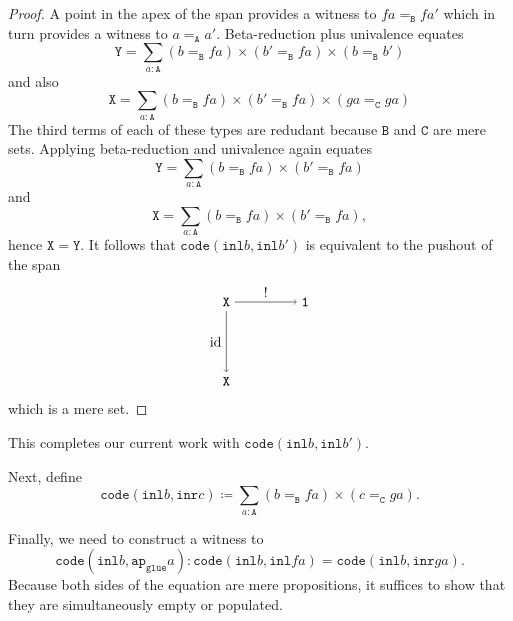 \documentclass[12pt]{amsart}
\newcommand{\bydef}{\coloneqq}
\newcommand{\type}[1]{\mathtt{#1}}
\newcommand{\tin}{\colon}
\newcommand{\A}{\type{A}}
\newcommand{\B}{\type{B}}
\newcommand{\C}{\type{C}}
\newcommand{\ap}{\type{ap}}
\newcommand{\inl}{\type{inl}}
\newcommand{\inr}{\type{inr}}
\newcommand{\glue}{\type{glue}}
\newcommand{\code}{\type{code}}
\DeclareMathOperator{\id}{id}
\theoremstyle{remark}
\theoremstyle{definition}
\begin{document}
\begin{proof}
  A point in the apex of the span provides a witness to
  \(
      fa =_\B fa'
  \)
  which in turn provides a witness to
  \(
      a =_\A a'.
  \)
  Beta-reduction plus univalence equates
  \[
    \type{Y} =
    \sum\limits_{a \tin \A}
    (b=_{\B} fa) \times (b'=_{\B} fa) \times (b=_{\B} b')
  \]
  and also
  \[
    \type{X} =
    \sum\limits_{a \tin \A}
    (b=_{\B} fa) \times (b'=_{\B} fa) \times ( ga =_{\C} ga )
  \]
  The third terms of each of these types are redudant because \( \B \)
  and \( \C \) are mere sets. Applying beta-reduction and univalence
  again equates
  \[
    \type{Y} =
    \sum\limits_{a \tin \A}
    (b=_{\B} fa) \times (b'=_{\B} fa)
  \]
  and
  \[
    \type{X} =
    \sum\limits_{a \tin \A}
    (b=_{\B} fa) \times (b'=_{\B} fa),
  \]
  hence
  \(
      \type{X} = \type{Y}.
  \)
  It follows that
  \(
      \code ( \inl b , \inl b')
  \)
  is equivalent to the pushout of the span
  \[
    \begin{tikzpicture}
      \node (1) at (-1,1) {\( \type{X} \)};
      \node (2) at (-1,-1) {\( \type{X} \)};
      \node (3) at (1,1) {\( \type{1} \)};
      \draw [->] (1) to node [left] {\( \id \)} (2);
      \draw [->] (1) to node [above] {\( ! \)} (3);
    \end{tikzpicture}
  \]
  which is a mere set.
%  
\end{proof}


This completes our current work with
\(
    \code ( \inl b , \inl b' ).
\)
\par

Next, define
\[
  \code ( \inl b , \inr c ) \bydef
  \sum_{ a : \A } ( b =_\B fa ) \times ( c =_\C ga ).
\]

Finally, we need to construct a witness to
\[
  \code ( \inl b , \ap_{\glue} a ) \tin
  \code ( \inl b , \inl fa ) =
  \code ( \inl b , \inr ga ). 
\]
Because both sides of the equation are mere propositions, it suffices
to show that they are simultaneously empty or populated.
\par

\end{document}
